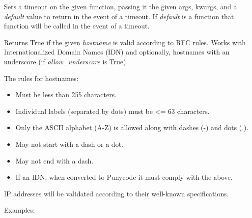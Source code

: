 \documentclass[letterpaper,10pt,openany]{sphinxmanual}
\begin{document}
\begin{fulllineitems}
\label{Developer/utils:gateone.core.utils.timeout_func}
Sets a timeout on the given function, passing it the given args, kwargs,
and a \emph{default} value to return in the event of a timeout.  If \emph{default} is
a function that function will be called in the event of a timeout.

\end{fulllineitems}


\begin{fulllineitems}
\label{Developer/utils:gateone.core.utils.valid_hostname}
Returns True if the given \emph{hostname} is valid according to RFC rules.  Works
with Internationalized Domain Names (IDN) and optionally, hostnames with an
underscore (if \emph{allow\_underscore} is True).

The rules for hostnames:
\begin{itemize}
\item {} 
Must be less than 255 characters.

\item {} 
Individual labels (separated by dots) must be \textless{}= 63 characters.

\item {} 
Only the ASCII alphabet (A-Z) is allowed along with dashes (-) and dots (.).

\item {} 
May not start with a dash or a dot.

\item {} 
May not end with a dash.

\item {} 
If an IDN, when converted to Punycode it must comply with the above.

\end{itemize}

IP addresses will be validated according to their well-known specifications.

Examples:


\end{fulllineitems}
\end{document}
